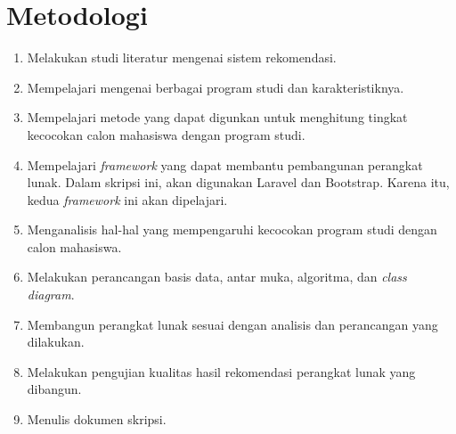 \section{Metodologi}
\label{sec:metodologi}
\begin{enumerate}
	\item Melakukan studi literatur mengenai sistem rekomendasi.
	
	\item Mempelajari mengenai berbagai program studi dan karakteristiknya.
	
	\item Mempelajari metode yang dapat digunkan untuk menghitung tingkat kecocokan calon mahasiswa dengan program studi.
	
	\item Mempelajari \textit{framework} yang dapat membantu pembangunan perangkat lunak. Dalam skripsi ini, akan digunakan Laravel dan Bootstrap. Karena itu, kedua \textit{framework} ini akan dipelajari.

	\item Menganalisis hal-hal yang mempengaruhi kecocokan program studi dengan calon mahasiswa.
	
	\item Melakukan perancangan basis data, antar muka, algoritma, dan \textit{class diagram}.
	
	\item Membangun perangkat lunak sesuai dengan analisis dan perancangan yang dilakukan.
	
	\item Melakukan pengujian kualitas hasil rekomendasi perangkat lunak yang dibangun.
	
	\item Menulis dokumen skripsi.
\end{enumerate}


